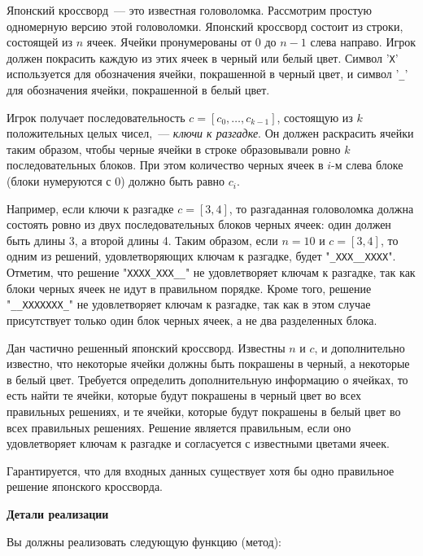 Японский кроссворд~--- это известная головоломка. Рассмотрим простую одномерную версию этой головоломки. Японский кроссворд состоит из строки, состоящей из $n$ ячеек. Ячейки пронумерованы от $0$ до $n - 1$ слева направо. Игрок должен покрасить каждую из этих ячеек в черный или белый цвет. Символ '\texttt{X}' используется для обозначения ячейки, покрашенной в черный цвет, и символ '\texttt{\_}' для обозначения ячейки, покрашенной в белый цвет.

Игрок получает последовательность $c = [c_0, \ldots, c_{k - 1}]$, состоящую из $k$ положительных целых чисел,~--- \textit{ключи к разгадке}. Он должен раскрасить ячейки таким образом, чтобы черные ячейки в строке образовывали ровно $k$ последовательных блоков. При этом количество черных ячеек в $i$-м слева блоке (блоки нумеруются с $0$) должно быть равно $c_i$.

Например, если ключи к разгадке $c = [3, 4]$, то разгаданная головоломка должна состоять ровно из двух последовательных блоков черных ячеек: один должен быть длины 3, а второй длины 4. Таким образом, если $n = 10$ и
$c = [3, 4]$, то одним из решений, удовлетворяющих ключам к разгадке, будет "\texttt{\_XXX\_\_XXXX}". Отметим, что решение "\texttt{XXXX\_XXX\_\_}" не удовлетворяет ключам к разгадке, так как блоки черных ячеек не идут в правильном порядке. Кроме того, решение "\texttt{\_\_XXXXXXX\_}" не удовлетворяет ключам к разгадке, так как в этом случае присутствует только один блок черных ячеек, а не два разделенных блока.

Дан частично решенный японский кроссворд. Известны $n$ и $c$, и дополнительно известно, что некоторые ячейки должны быть покрашены в черный, а некоторые в белый цвет. Требуется определить дополнительную информацию о ячейках, то есть найти те ячейки, которые будут покрашены в черный цвет во всех правильных решениях, и те ячейки, которые будут покрашены в белый цвет во всех правильных решениях. Решение является правильным, если оно удовлетворяет ключам к разгадке и согласуется с известными цветами ячеек.

Гарантируется, что для входных данных существует хотя бы одно правильное решение японского кроссворда.

\textbf{Детали реализации}

Вы должны реализовать следующую функцию (метод):


